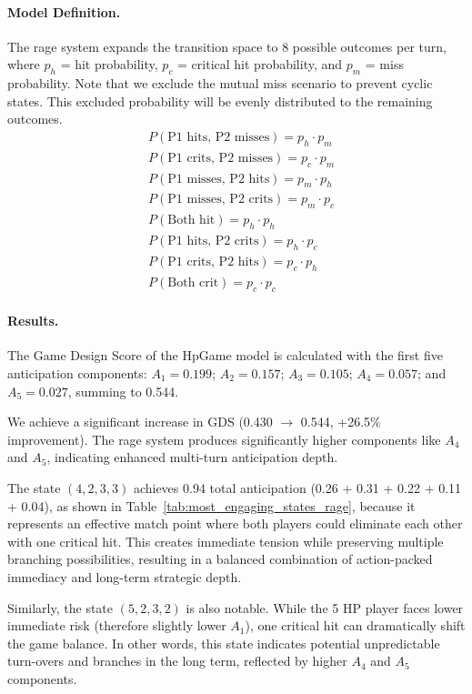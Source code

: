 \documentclass[manuscript,review,anonymous]{acmart}
\theoremstyle{definition}
\theoremstyle{plain}
\begin{document}
\paragraph{Model Definition.}
The rage system expands the transition space to 8 possible outcomes per turn, where $p_h$ = hit probability, $p_c$ = critical hit probability, and $p_m$ = miss probability.
Note that we exclude the mutual miss scenario to prevent cyclic states.
This excluded probability will be evenly distributed to the remaining outcomes.
\begin{align}
  &P(\text{P1 hits, P2 misses}) = p_h \cdot p_m \\
  &P(\text{P1 crits, P2 misses}) = p_c \cdot p_m \\
  &P(\text{P1 misses, P2 hits}) = p_m \cdot p_h \\
  &P(\text{P1 misses, P2 crits}) = p_m \cdot p_c \\
  &P(\text{Both hit}) = p_h \cdot p_h \\
  &P(\text{P1 hits, P2 crits}) = p_h \cdot p_c \\
  &P(\text{P1 crits, P2 hits}) = p_c \cdot p_h \\
  &P(\text{Both crit}) = p_c \cdot p_c
\end{align}

\paragraph{Results.}
The Game Design Score of the HpGame model is calculated with the first five anticipation components: $A_1 = 0.199$; $A_2 = 0.157$; $A_3 = 0.105$; $A_4 = 0.057$; and $A_5 = 0.027$, summing to 0.544.

We achieve a significant increase in GDS (0.430 $\rightarrow$ 0.544, +26.5\% improvement).
The rage system produces significantly higher components like $A_4$ and $A_5$, indicating enhanced multi-turn anticipation depth.

The state $(4, 2, 3, 3)$ achieves 0.94 total anticipation (0.26 + 0.31 + 0.22 + 0.11 + 0.04), as shown in Table~\ref{tab:most_engaging_states_rage}, because it represents an effective match point where both players could eliminate each other with one critical hit.
This creates immediate tension while preserving multiple branching possibilities, resulting in a balanced combination of action-packed immediacy and long-term strategic depth.

Similarly, the state $(5, 2, 3, 2)$ is also notable.
While the 5 HP player faces lower immediate risk (therefore slightly lower $A_1$), one critical hit can dramatically shift the game balance.
In other words, this state indicates potential unpredictable turn-overs and branches in the long term, reflected by higher $A_4$ and $A_5$ components.
\end{document}
